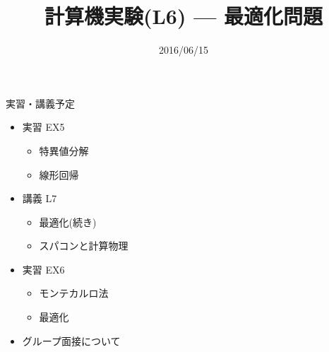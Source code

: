 \documentclass[dvipdfmx]{beamer}
\title{計算機実験(L6) --- 最適化問題}
\date{2016/06/15}
\begin{document}
\begin{frame}
  \titlepage
  \tableofcontents
\end{frame}










\section{}

\begin{frame}[t,fragile]{実習・講義予定}
  \begin{itemize}
    \setlength{\itemsep}{1em}
  \item 実習 EX5
    \begin{itemize}
    \item 特異値分解
    \item 線形回帰
    \end{itemize}
  \item 講義 L7
    \begin{itemize}
    \item 最適化(続き)
    \item スパコンと計算物理
    \end{itemize}
  \item 実習 EX6
    \begin{itemize}
    \item モンテカルロ法
    \item 最適化
    \end{itemize}
  \item グループ面接について
  \end{itemize}
\end{frame}
\end{document}

